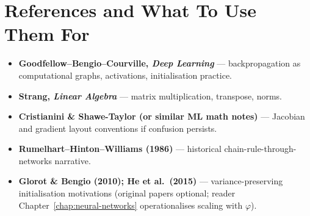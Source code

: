 \section*{References and What To Use Them For}
\begin{itemize}[leftmargin=1.5em]
  \item \textbf{Goodfellow--Bengio--Courville, \emph{Deep Learning}} --- backpropagation as computational graphs, activations, initialisation practice.
  \item \textbf{Strang, \emph{Linear Algebra}} --- matrix multiplication, transpose, norms.
  \item \textbf{Cristianini \& Shawe-Taylor (or similar ML math notes)} --- Jacobian and gradient layout conventions if confusion persists.
  \item \textbf{Rumelhart--Hinton--Williams (1986)} --- historical chain-rule-through-networks narrative.
  \item \textbf{Glorot \& Bengio (2010); He et al.\ (2015)} --- variance-preserving initialisation motivations (original papers optional; reader Chapter~\ref{chap:neural-networks} operationalises scaling with \(\varphi\)).
\end{itemize}
